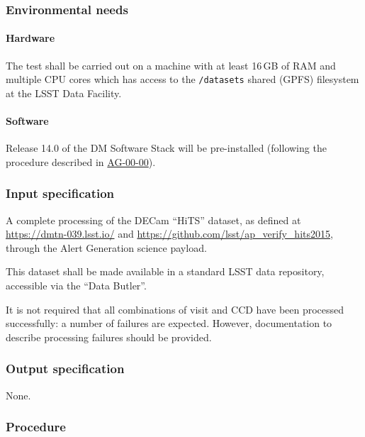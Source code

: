 \subsubsection{Environmental needs}

\paragraph{Hardware}

The test shall be carried out on a machine with at least 16\,GB of RAM and
multiple CPU cores which has access to the \texttt{/datasets} shared (GPFS)
filesystem at the LSST Data Facility.

\paragraph{Software}

Release 14.0 of the DM Software Stack will be pre-installed (following the
procedure described in \hyperref[ag-00-00]{AG-00-00}).

\subsubsection{Input specification}

A complete processing of the DECam ``HiTS'' dataset, as defined at
\url{https://dmtn-039.lsst.io/} and
\url{https://github.com/lsst/ap_verify_hits2015}, through the Alert
Generation science payload.

This dataset shall be made available in a standard LSST data repository,
accessible via the ``Data Butler''.

It is not required that all combinations of visit and CCD have been processed
successfully: a number of failures are expected. However, documentation to
describe processing failures should be provided.

\subsubsection{Output specification}

None.

\subsubsection{Procedure}

